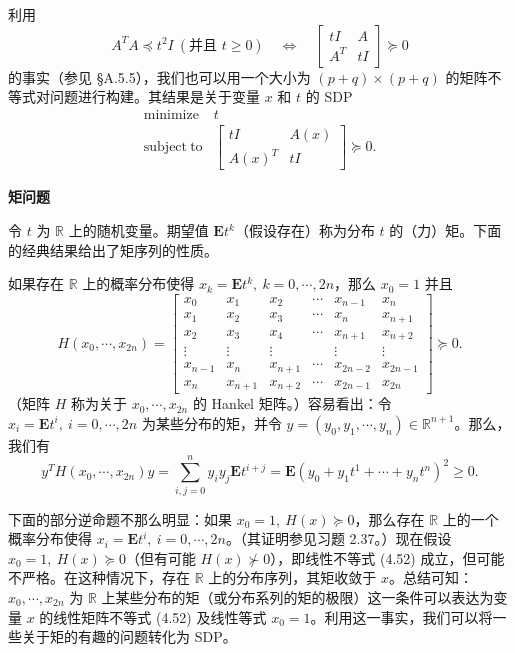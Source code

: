 \documentclass[UTF8,12pt,a4paper,fontset=fandol]{ctexart}
\begin{document}
利用
\[
A^TA\preceq t^2I\ (\text{并且 }t\geq 0)\quad\Longleftrightarrow\quad
\begin{bmatrix}
tI & A\\
A^T & tI
\end{bmatrix}\succeq 0
\]
的事实（参见 \S A.5.5），我们也可以用一个大小为 $(p+q)\times(p+q)$ 的矩阵不等式对问题进行构建。其结果是关于变量 $x$ 和 $t$ 的 SDP
\[
\begin{array}{ll}
\mathop{\mathrm{minimize}} & t\\
\mathrm{subject\ to} &
\begin{bmatrix}
tI & A(x)\\
A(x)^T & tI
\end{bmatrix}\succeq 0.
\end{array}
\]

\noindent\textbf{矩问题}

令 $t$ 为 $\mathbb{R}$ 上的随机变量。期望值 $\mathbf{E}t^k$（假设存在）称为分布 $t$ 的（力）矩。下面的经典结果给出了矩序列的性质。

如果存在 $\mathbb{R}$ 上的概率分布使得 $x_k=\mathbf{E}t^k,\ k=0,\cdots,2n$，那么 $x_0=1$ 并且
\begin{equation}
H(x_0,\cdots,x_{2n})=
\begin{bmatrix}
x_0 & x_1 & x_2 & \cdots & x_{n-1} & x_n\\
x_1 & x_2 & x_3 & \cdots & x_n & x_{n+1}\\
x_2 & x_3 & x_4 & \cdots & x_{n+1} & x_{n+2}\\
\vdots & \vdots & \vdots & & \vdots & \vdots\\
x_{n-1} & x_n & x_{n+1} & \cdots & x_{2n-2} & x_{2n-1}\\
x_n & x_{n+1} & x_{n+2} & \cdots & x_{2n-1} & x_{2n}
\end{bmatrix}\succeq 0.
\tag{4.52}
\end{equation}
（矩阵 $H$ 称为关于 $x_0,\cdots,x_{2n}$ 的 Hankel 矩阵。）容易看出：令 $x_i=\mathbf{E}t^i,\ i=0,\cdots,2n$ 为某些分布的矩，并令 $y=(y_0,y_1,\cdots,y_n)\in\mathbb{R}^{n+1}$。那么，我们有
\[
y^TH(x_0,\cdots,x_{2n})y=\sum_{i,j=0}^n y_iy_j\mathbf{E}t^{i+j}
=\mathbf{E}(y_0+y_1t^1+\cdots+y_nt^n)^2\geq 0.
\]

下面的部分逆命题不那么明显：如果 $x_0=1,\ H(x)\succeq 0$，那么存在 $\mathbb{R}$ 上的一个概率分布使得 $x_i=\mathbf{E}t^i,\ i=0,\cdots,2n$。（其证明参见习题 2.37。）现在假设 $x_0=1,\ H(x)\succeq 0$（但有可能 $H(x)\not\succ 0$），即线性不等式 (4.52) 成立，但可能不严格。在这种情况下，存在 $\mathbb{R}$ 上的分布序列，其矩收敛于 $x$。总结可知：$x_0,\cdots,x_{2n}$ 为 $\mathbb{R}$ 上某些分布的矩（或分布系列的矩的极限）这一条件可以表达为变量 $x$ 的线性矩阵不等式 (4.52) 及线性等式 $x_0=1$。利用这一事实，我们可以将一些关于矩的有趣的问题转化为 SDP。
\end{document}

